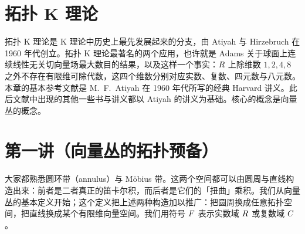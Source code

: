 \section{拓扑 K 理论}

拓扑 K 理论是 K 理论中历史上最先发展起来的分支，由 Atiyah 与 Hirzebruch 在 1960 年代创立。拓扑 K 理论最著名的两个应用，也许就是 Adams 关于球面上连续线性无关切向量场最大数目的结果，以及这样一个事实：$R$ 上除维数 $1,2,4,8$ 之外不存在有限维可除代数，这四个维数分别对应实数、复数、四元数与八元数。本章的基本参考文献是 M.~F.~Atiyah 在 1960 年代所写的经典 Harvard 讲义。此后文献中出现的其他一些书与讲义都以 Atiyah 的讲义为基础。核心的概念是向量丛的概念。


\section{第一讲（向量丛的拓扑预备）}

大家都熟悉圆环带（annulus）与 Möbius 带。这两个空间都可以由圆周与直线构造出来：前者是二者真正的笛卡尔积，而后者是它们的「扭曲」乘积。我们从向量丛的基本定义开始；这个定义把上述两种构造加以推广：把圆周换成任意拓扑空间，把直线换成某个有限维向量空间。我们用符号 $F$ 表示实数域 $R$ 或复数域 $C$。


